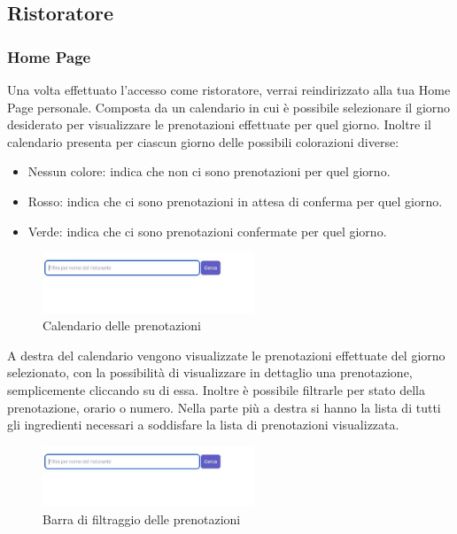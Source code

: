 \subsection{Ristoratore} %

    \subsubsection{Home Page}
    Una volta effettuato l'accesso come ristoratore, verrai reindirizzato alla tua Home Page personale. Composta da un calendario in cui è possibile selezionare il giorno desiderato per visualizzare le prenotazioni effettuate per quel giorno. Inoltre il calendario presenta per ciascun giorno delle possibili colorazioni diverse:
        \begin{itemize}
            \item Nessun colore: indica che non ci sono prenotazioni per quel giorno.
            \item Rosso: indica che ci sono prenotazioni in attesa di conferma per quel giorno.
            \item Verde: indica che ci sono prenotazioni confermate per quel giorno.
        \end{itemize}
        
        \begin{figure}[htbp]
            \centering
            \includegraphics[width=0.5625\textwidth]{./img/Dettaglio.jpg}
            \caption{Calendario delle prenotazioni}
        \end{figure}
        
        A destra del calendario vengono visualizzate le prenotazioni effettuate del giorno selezionato, con la possibilità di visualizzare in dettaglio una prenotazione, semplicemente cliccando su di essa. Inoltre è possibile filtrarle per stato della prenotazione, orario o numero. Nella parte più a destra si hanno la lista di tutti gli ingredienti necessari a soddisfare la lista di prenotazioni visualizzata.
        
        \begin{figure}[htbp]
            \centering
            \includegraphics[width=0.5625\textwidth]{./img/Dettaglio.jpg}
            \caption{Barra di filtraggio delle prenotazioni}
        \end{figure}
        
